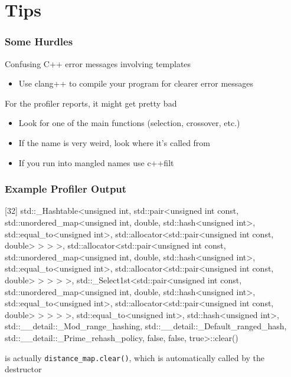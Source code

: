 \documentclass[aspectratio=169,10pt,compress]{beamer}
\begin{document}
\section{Tips}

\begin{frame}
  \frametitle{Some Hurdles}

  Confusing C++ error messages involving templates
  \begin{itemize}
    \item Use {\ttfamily clang++} to compile your program for clearer error
      messages
  \end{itemize}

  \vspace{2em}

  For the profiler reports, it might get pretty bad

  \begin{itemize}
    \item Look for one of the main functions (selection, crossover, etc.)
    \item If the name is very weird, look where it's called from
    \item If you run into mangled names use {\ttfamily c++filt}
  \end{itemize}
\end{frame}

\begin{frame}[fragile]
  \frametitle{Example Profiler Output}

  {\ttfamily \tiny
    [32] std::\_Hashtable<unsigned int, std::pair<unsigned int const,
    std::unordered\_map<unsigned int, double, std::hash<unsigned int>,
    std::equal\_to<unsigned int>, std::allocator<std::pair<unsigned int const,
    double> > > >, std::allocator<std::pair<unsigned int const,
    std::unordered\_map<unsigned int, double, std::hash<unsigned int>,
    std::equal\_to<unsigned int>, std::allocator<std::pair<unsigned int const,
    double> > > > >, std::\_Select1st<std::pair<unsigned int const,
    std::unordered\_map<unsigned int, double, std::hash<unsigned int>,
    std::equal\_to<unsigned int>, std::allocator<std::pair<unsigned int const,
    double> > > > >, std::equal\_to<unsigned int>, std::hash<unsigned int>,
    std::\_\_detail::\_Mod\_range\_hashing,
    std::\_\_detail::\_Default\_ranged\_hash,
    std::\_\_detail::\_Prime\_rehash\_policy, false, false, true>::clear()
  }

  \vfill

  is actually {\tt distance\_map.clear()}, which is automatically called by the
  destructor
\end{frame}
\end{document}
